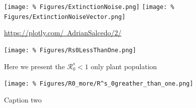 \begin{figure}[ht]
	\begin{center}
	\texttt{[image: \%
	Figures/ExtinctionNoise.png]}
	\texttt{[image: \%
	Figures/ExtinctionNoiseVector.png]}
	\end{center}
	\caption{%
		\href{https://plotly.com/~AdrianSalcedo/2/}{%
		https://plotly.com/~AdrianSalcedo/2/}}
	\label{fig:ExtinctionByNoise}
\end{figure}
\begin{figure}[ht]
	\centering
	\texttt{[image: \%
	Figures/Rs0LessThanOne.png]}
	
	\caption{Here we present the $\mathcal{R}^s_0<1$ only plant population}
	\label{fig:Rs0SmallerThanOne}
\end{figure}
\begin{figure}[ht]
	\centering
	\texttt{[image: \%
	Figures/R0\_more/R^s\_0greather\_than\_one.png]}
	\caption{Caption two}
	\label{fig:Rs0GreatherThanOne}
\end{figure}

